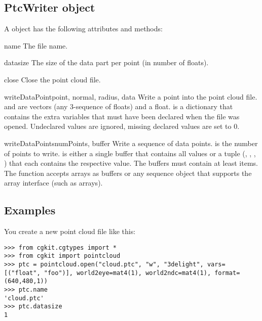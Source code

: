 \subsection{PtcWriter object}

A  object has the following attributes and methods:

\begin{memberdesc}{name}
The file name.
\end{memberdesc}

\begin{memberdesc}{datasize}
The size of the data part per point (in number of floats).
\end{memberdesc}

\begin{methoddesc}{close}{}
Close the point cloud file.
\end{methoddesc}

\begin{methoddesc}{writeDataPoint}{point, normal, radius, data}
Write a point into the point cloud file.
 and  are vectors (any 3-sequence of floats) and
 a float.  is a dictionary that contains the extra
variables that must have been declared when the file was opened.
Undeclared values are ignored, missing declared values are set to 0.
\end{methoddesc}

\begin{methoddesc}{writeDataPoints}{numPoints, buffer}
Write a sequence of data points.
 is the number of points to write.  is either a
single buffer that contains all values or a tuple (,
, , ) that each contains the
respective value. The buffers must contain at least  items.
The function accepts  arrays as buffers or any sequence object
that supports the array interface (such as  arrays).
\end{methoddesc}

\subsection{Examples}

You create a new point cloud file like this:

\begin{verbatim}
>>> from cgkit.cgtypes import *
>>> from cgkit import pointcloud
>>> ptc = pointcloud.open("cloud.ptc", "w", "3delight", vars=[("float", "foo")], world2eye=mat4(1), world2ndc=mat4(1), format=(640,480,1))
>>> ptc.name
'cloud.ptc'
>>> ptc.datasize
1
\end{verbatim}

